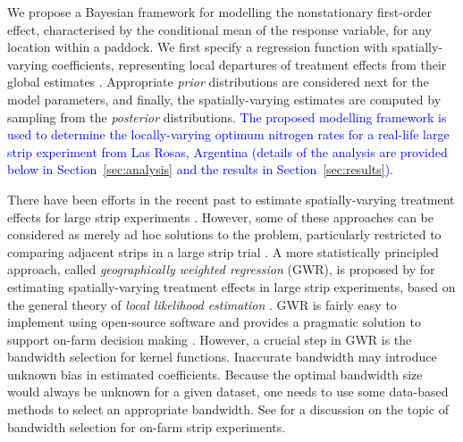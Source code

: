 \documentclass[a4paper]{article}   	%
\begin{document}
	
	We propose a Bayesian framework for modelling the nonstationary first-order effect, characterised by the conditional mean of the response variable, for any location within a paddock. We first specify a regression function with spatially-varying coefficients, representing local departures of treatment effects from their global estimates \parencite{Banerjee2004Hierarchical}. Appropriate \emph{prior} distributions are considered next for the model parameters, and finally, the spatially-varying estimates are computed by sampling from the \emph{posterior} distributions. \textcolor{blue}{The proposed modelling framework is used to determine the locally-varying optimum nitrogen rates for a real-life large strip experiment from Las Rosas, Argentina (details of the analysis are provided below in Section~\ref{sec:analysis} and the results in Section~\ref{sec:results})}.  
	
	
	There have been efforts in the recent past to estimate spatially-varying treatment effects for large strip experiments \parencite{Lawes2012Simple, Marchant2019Establishinga, Rakshit2020Novel, Evans2020Assessment}. However, some of these approaches can be considered as merely ad hoc solutions to the problem, particularly restricted to comparing adjacent strips in a large strip trial \parencite{Lawes2012Simple}. A more statistically principled approach, called \emph{geographically weighted regression} (GWR), is proposed by \textcite{Rakshit2020Novel} for estimating spatially-varying treatment effects in large strip experiments, based on the general theory of \emph{local likelihood estimation} \parencite{Hastie1993Local}. GWR is fairly easy to implement using open-source software and provides a pragmatic solution to support on-farm decision making \parencite{Evans2020Assessment}. However, a crucial step in GWR is the bandwidth selection for kernel functions. Inaccurate bandwidth may introduce unknown bias in estimated coefficients. Because the optimal bandwidth size would always be unknown for a given dataset, one needs to use some data-based methods to select an appropriate bandwidth. See \textcite{Rakshit2020Novel} for a discussion on the topic of bandwidth selection for on-farm strip experiments. %
	
\end{document}
